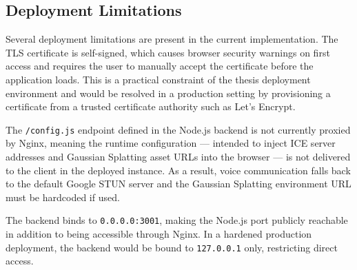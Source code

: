 \subsection{Deployment Limitations}
\label{sec:deployment_limitations}

Several deployment limitations are present in the current implementation.
The TLS certificate is self-signed, which causes browser security warnings
on first access and requires the user to manually accept the certificate
before the application loads. This is a practical constraint of the
thesis deployment environment and would be resolved in a production
setting by provisioning a certificate from a trusted certificate authority
such as Let's Encrypt.

The \texttt{/config.js} endpoint defined in the Node.js backend is not
currently proxied by Nginx, meaning the runtime configuration --- intended
to inject ICE server addresses and Gaussian Splatting asset URLs into the
browser --- is not delivered to the client in the deployed instance. As a
result, voice communication falls back to the default Google STUN server
and the Gaussian Splatting environment URL must be hardcoded if used.

The backend binds to \texttt{0.0.0.0:3001}, making the Node.js port
publicly reachable in addition to being accessible through Nginx. In a
hardened production deployment, the backend would be bound to
\texttt{127.0.0.1} only, restricting direct access.